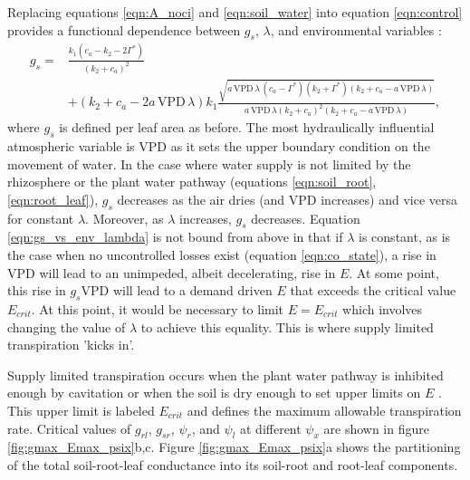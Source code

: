 \documentclass[utf8]{frontiersSCNS} %
\begin{document}
Replacing equations \ref{eqn:A_noci} and \ref{eqn:soil_water} into equation \ref{eqn:control} provides a functional dependence between $g_s$, $\lambda$, and environmental variables \citep{katul_stomatal_2009}:
\begin{equation}
    \label{eqn:gs_vs_env_lambda}
    \begin{split}
        g_s = & \frac{k_1 (c_a - k_2 - 2 \Gamma^*)}{(k_2+c_a)^2} \\
        & + (k_2+c_a-2 a\, \text{VPD}\, \lambda) k_1 \frac{\sqrt{a\, \text{VPD}\, \lambda\, (c_a-\Gamma^*)(k_2+\Gamma^*)(k_2+c_a-a\, \text{VPD}\, \lambda)}}{a\, \text{VPD}\, \lambda (k_2 +c_a)^2(k_2 +c_a-a\, \text{VPD}\, \lambda)} ,
    \end{split}
\end{equation}
where $g_s$ is defined per leaf area as before. The most hydraulically influential atmospheric variable is VPD as it sets the upper boundary condition on the movement of water. In the case where water supply is not limited by the rhizosphere or the plant water pathway (equations \ref{eqn:soil_root}, \ref{eqn:root_leaf}), $g_s$ decreases as the air dries (and VPD increases) and vice versa for constant $\lambda$. Moreover, as $\lambda$ increases, $g_s$ decreases. Equation \ref{eqn:gs_vs_env_lambda} is not bound from above in that if $\lambda$ is constant, as is the case when no uncontrolled losses exist (equation \ref{eqn:co_state}), a rise in VPD will lead to an unimpeded, albeit decelerating, rise in $E$. At some point, this rise in $g_s \text{VPD}$ will lead to a demand driven $E$ that exceeds the critical value $E_{crit}$. At this point, it would be necessary to limit $E = E_{crit}$ which involves changing the value of $\lambda$ to achieve this equality. This is where supply limited transpiration 'kicks in'.

Supply limited transpiration occurs when the plant water pathway is inhibited enough by cavitation or when the soil is dry enough to set upper limits on $E$ \citep{west_transpiration_2008}. This upper limit is labeled $E_{crit}$ and defines the maximum allowable transpiration rate. Critical values of $g_{rl}$, $g_{sr}$, $\psi_r$, and $\psi_l$ at different $\psi_x$ are shown in figure \ref{fig:gmax_Emax_psix}b,c. Figure \ref{fig:gmax_Emax_psix}a shows the partitioning of the total soil-root-leaf conductance into its soil-root and root-leaf components. 
\end{document}
